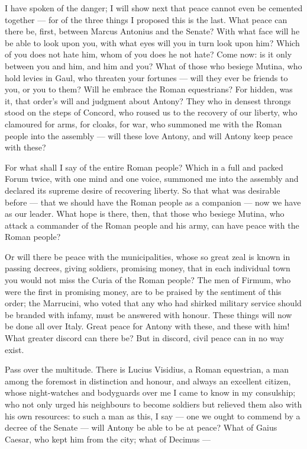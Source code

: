  I have spoken of the danger; I will show next that peace cannot even be cemented together --- for of the three things I proposed this is the last. What peace can there be, first, between Marcus Antonius and the Senate? With what face will he be able to look upon you, with what eyes will you in turn look upon him? Which of you does not hate him, whom of you does he not hate? Come now: is it only between you and him, and him and you? What of those who besiege Mutina, who hold levies in Gaul, who threaten your fortunes --- will they ever be friends to you, or you to them? Will he embrace the Roman equestrians? For hidden, was it, that order's will and judgment about Antony? They who in densest throngs stood on the steps of Concord, who roused us to the recovery of our liberty, who clamoured for arms, for cloaks, for war, who summoned me with the Roman people into the assembly --- will these love Antony, and will Antony keep peace with these?

 For what shall I say of the entire Roman people? Which in a full and packed Forum twice, with one mind and one voice, summoned me into the assembly and declared its supreme desire of recovering liberty. So that what was desirable before --- that we should have the Roman people as a companion --- now we have as our leader. What hope is there, then, that those who besiege Mutina, who attack a commander of the Roman people and his army, can have peace with the Roman people?

 Or will there be peace with the municipalities, whose so great zeal is known in passing decrees, giving soldiers, promising money, that in each individual town you would not miss the Curia of the Roman people? The men of Firmum, who were the first in promising money, are to be praised by the sentiment of this order; the Marrucini, who voted that any who had shirked military service should be branded with infamy, must be answered with honour. These things will now be done all over Italy. Great peace for Antony with these, and these with him! What greater discord can there be? But in discord, civil peace can in no way exist.

 Pass over the multitude. There is Lucius Visidius, a Roman equestrian, a man among the foremost in distinction and honour, and always an excellent citizen, whose night-watches and bodyguards over me I came to know in my consulship; who not only urged his neighbours to become soldiers but relieved them also with his own resources: to such a man as this, I say --- one we ought to commend by a decree of the Senate --- will Antony be able to be at peace? What of Gaius Caesar, who kept him from the city; what of Decimus ---

